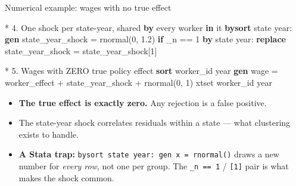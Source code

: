 \documentclass[
  11pt,
  ignorenonframetext,
  aspectratio=169,
]{beamer}
\newenvironment{Shaded}{\begin{snugshade}}{\end{snugshade}}
\newcommand{\DataTypeTok}[1]{\textcolor[rgb]{0.68,0.00,0.00}{#1}}
\newcommand{\FunctionTok}[1]{\textcolor[rgb]{0.28,0.35,0.67}{#1}}
\newcommand{\KeywordTok}[1]{\textcolor[rgb]{0.00,0.23,0.31}{\textbf{#1}}}
\newcommand{\NormalTok}[1]{\textcolor[rgb]{0.00,0.23,0.31}{#1}}
\providecommand{\tightlist}{%
  \setlength{\itemsep}{0pt}\setlength{\parskip}{0pt}}
\begin{document}
\begin{frame}[fragile]{Numerical example: wages with no true effect}
\protect{}\label{numerical-example-wages-with-no-true-effect}
\begin{Shaded}
\begin{Highlighting}[]
\NormalTok{* 4. One shock per state{-}}\FunctionTok{year}\NormalTok{, shared }\KeywordTok{by}\NormalTok{ every worker }\KeywordTok{in}\NormalTok{ it}
\KeywordTok{bysort}\NormalTok{ state }\FunctionTok{year}\NormalTok{: }\KeywordTok{gen}\NormalTok{ state\_year\_shock = rnormal(0, 1.2) }\KeywordTok{if} \DataTypeTok{\_n}\NormalTok{ == 1}
\KeywordTok{by}\NormalTok{ state }\FunctionTok{year}\NormalTok{: }\KeywordTok{replace}\NormalTok{ state\_year\_shock = state\_year\_shock[1]}

\NormalTok{* 5. Wages with ZERO true policy effect}
\KeywordTok{sort}\NormalTok{ worker\_id }\FunctionTok{year}
\KeywordTok{gen}\NormalTok{ wage = worker\_effect + state\_year\_shock + rnormal(0, 1)}
\NormalTok{xtset worker\_id }\FunctionTok{year}
\end{Highlighting}
\end{Shaded}

\begin{itemize}
\tightlist
\item
  \textbf{The true effect is exactly zero.} Any rejection is a false
  positive.
\item
  The state-year shock correlates residuals within a state --- what
  clustering exists to handle.
\item
  \textbf{A Stata trap:}
  \texttt{bysort\ state\ year:\ gen\ x\ =\ rnormal()} draws a new number
  for \emph{every row}, not one per group. The \texttt{\_n\ ==\ 1} /
  \texttt{{[}1{]}} pair is what makes the shock common.
\end{itemize}
\end{frame}
\end{document}
